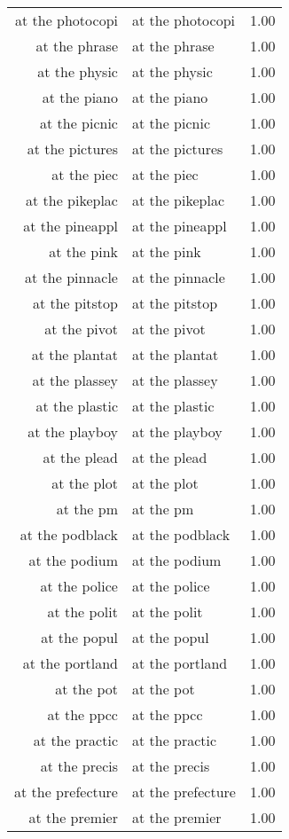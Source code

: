 \begin{table}[ht]
\begin{tabular}{rlr}
  at the photocopi & at the photocopi & 1.00 \\ 
  at the phrase & at the phrase & 1.00 \\ 
  at the physic & at the physic & 1.00 \\ 
  at the piano & at the piano & 1.00 \\ 
  at the picnic & at the picnic & 1.00 \\ 
  at the pictures & at the pictures & 1.00 \\ 
  at the piec & at the piec & 1.00 \\ 
  at the pikeplac & at the pikeplac & 1.00 \\ 
  at the pineappl & at the pineappl & 1.00 \\ 
  at the pink & at the pink & 1.00 \\ 
  at the pinnacle & at the pinnacle & 1.00 \\ 
  at the pitstop & at the pitstop & 1.00 \\ 
  at the pivot & at the pivot & 1.00 \\ 
  at the plantat & at the plantat & 1.00 \\ 
  at the plassey & at the plassey & 1.00 \\ 
  at the plastic & at the plastic & 1.00 \\ 
  at the playboy & at the playboy & 1.00 \\ 
  at the plead & at the plead & 1.00 \\ 
  at the plot & at the plot & 1.00 \\ 
  at the pm & at the pm & 1.00 \\ 
  at the podblack & at the podblack & 1.00 \\ 
  at the podium & at the podium & 1.00 \\ 
  at the police & at the police & 1.00 \\ 
  at the polit & at the polit & 1.00 \\ 
  at the popul & at the popul & 1.00 \\ 
  at the portland & at the portland & 1.00 \\ 
  at the pot & at the pot & 1.00 \\ 
  at the ppcc & at the ppcc & 1.00 \\ 
  at the practic & at the practic & 1.00 \\ 
  at the precis & at the precis & 1.00 \\ 
  at the prefecture & at the prefecture & 1.00 \\ 
  at the premier & at the premier & 1.00 \\ 

\end{tabular}
\end{table}
